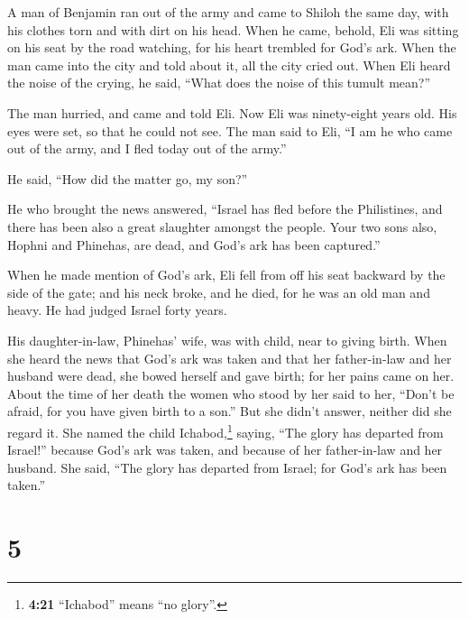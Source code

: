  A man of Benjamin ran out of the army and came to Shiloh
the same day, with his clothes torn and with dirt on his head.
 When he came, behold, Eli was sitting on his seat by the
road watching, for his heart trembled for God's ark. When the man came
into the city and told about it, all the city cried out. 
When Eli heard the noise of the crying, he said, ``What does the noise
of this tumult mean?''

The man hurried, and came and told Eli.  Now Eli was
ninety-eight years old. His eyes were set, so that he could not see.
 The man said to Eli, ``I am he who came out of the army,
and I fled today out of the army.''

He said, ``How did the matter go, my son?''

 He who brought the news answered, ``Israel has fled
before the Philistines, and there has been also a great slaughter
amongst the people. Your two sons also, Hophni and Phinehas, are dead,
and God's ark has been captured.''

 When he made mention of God's ark, Eli fell from off his
seat backward by the side of the gate; and his neck broke, and he died,
for he was an old man and heavy. He had judged Israel forty years.

 His daughter-in-law, Phinehas' wife, was with child,
near to giving birth. When she heard the news that God's ark was taken
and that her father-in-law and her husband were dead, she bowed herself
and gave birth; for her pains came on her.  About the
time of her death the women who stood by her said to her, ``Don't be
afraid, for you have given birth to a son.'' But she didn't answer,
neither did she regard it.  She named the child
Ichabod,\footnote{\textbf{4:21} ``Ichabod'' means ``no glory''.} saying,
``The glory has departed from Israel!'' because God's ark was taken, and
because of her father-in-law and her husband.  She said,
``The glory has departed from Israel; for God's ark has been taken.''

\hypertarget{section-4}{%
\section{5}\label{section-4}}

